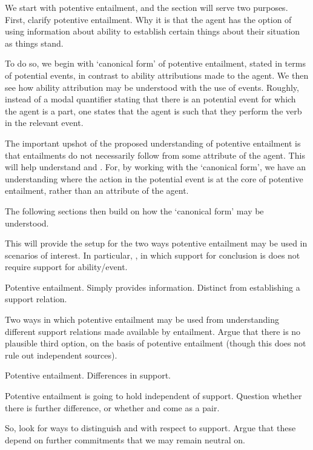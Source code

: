 \begin{note}
  We start with potentive entailment, and the section will serve two purposes.
  First, clarify potentive entailment.
  Why it is that the agent has the option of using information about ability to establish certain things about their situation as things stand.

  To do so, we begin with `canonical form' of potentive entailment, stated in terms of potential events, in contrast to ability attributions made to the agent.
  We then see how ability attribution may be understood with the use of events.
  Roughly, instead of a modal quantifier stating that there is an potential event for which the agent is a part, one states that the agent is such that they perform the verb in the relevant event.

  The important upshot of the proposed understanding of potentive entailment is that entailments do not necessarily follow from some attribute of the agent.
  This will help understand \AR{} and \WR{}.
  For, by working with the `canonical form', we have an understanding where the action in the potential event is at the core of potentive entailment, rather than an attribute of the agent.

  The following sections then build on how the `canonical form' may be understood.

  This will provide the setup for the two ways potentive entailment may be used in scenarios of interest.
  In particular, \WR{}, in which support for conclusion is does not require support for ability/event.
\end{note}

\begin{note}
  Potentive entailment.
  Simply provides information.
  Distinct from establishing a support relation.

  Two ways in which potentive entailment may be used from understanding different support relations made available by entailment.
  Argue that there is no plausible third option, on the basis of potentive entailment (though this does not rule out independent sources).
\end{note}

\begin{note}
  Potentive entailment.
  Differences in support.

  Potentive entailment is going to hold independent of support.
  Question whether there is further difference, or whether \AR{} and \WR{} come as a pair.

  So, look for ways to distinguish \AR{} and \WR{} with respect to support.
  Argue that these depend on further commitments that we may remain neutral on.
\end{note}

